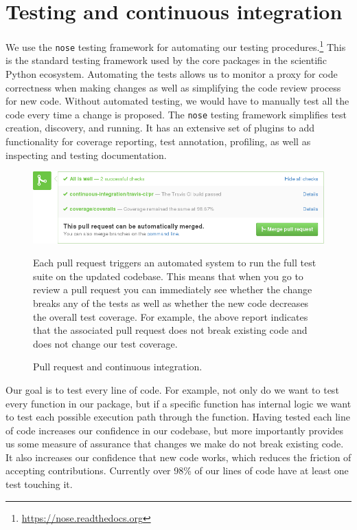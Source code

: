 \section{\label{sec:test}Testing and continuous integration}

We use the \texttt{nose} testing framework for automating our testing
procedures.\footnote{\url{https://nose.readthedocs.org}}  This is the standard
testing framework used by the core packages in the scientific Python ecosystem.
Automating the tests allows us to monitor a proxy for code correctness when
making changes as well as simplifying the code review process for new code.
Without automated testing, we would have to manually test all the code every
time a change is proposed.  The \texttt{nose} testing framework simplifies test
creation, discovery, and running. It has an extensive set of plugins to add
functionality for coverage reporting, test annotation, profiling, as well as
inspecting and testing documentation.

\begin{figure}
  \begin{centering}
    \includegraphics[width=\textwidth]{fig/pull-request-ci.png}\par
  \end{centering}

  \caption{\label{fig:pull-request}Pull request and continuous integration.}
\setlength{\leftskip}{1cm}
\setlength{\rightskip}{1cm}
\small
Each pull request triggers an automated system to run the  full test suite on
the updated codebase.
This means that when you go to review a pull request you can immediately see
whether the change breaks any of the tests as well as whether the new
code decreases the overall test coverage.
For example, the above report indicates that the associated pull request does not
break existing code and does not change our test coverage.
\end{figure}

Our goal is to test every line of code.  For example, not only do we want to
test every function in our package, but if a specific function has internal
logic we want to test each possible execution path through the function.
Having tested each line of code increases our confidence in our codebase, but
more importantly provides us some measure of assurance that changes we make do
not break existing code.  It also increases our confidence that new code works,
which reduces the friction of accepting contributions.  Currently over 98\% of
our lines of code have at least one test touching it.

